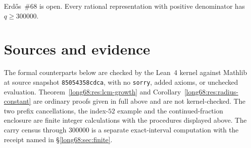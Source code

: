 \documentclass[11pt]{article}
\renewcommand{\commitshort}{85054358cdca}
\begin{document}
\medskip
\noindent Erd\H{o}s~\#68 is open.  Every rational representation with
positive denominator has $q\ge300000$.

\section*{Sources and evidence}

The formal counterparts below are checked by the Lean~4 kernel against
Mathlib at source snapshot \texttt{\commitshort}, with no \texttt{sorry},
added axioms, or unchecked evaluation.  Theorem~\ref{long68:res:lcm-growth} and
Corollary~\ref{long68:res:radius-constant} are ordinary proofs given in full above
and are not kernel-checked.  The two prefix cancellations, the index-$52$
example and the continued-fraction enclosure are finite integer calculations
with the procedures displayed above.  The carry census through $300000$ is a
separate exact-interval computation with the receipt named in
\S\ref{long68:sec:finite}.
\end{document}
